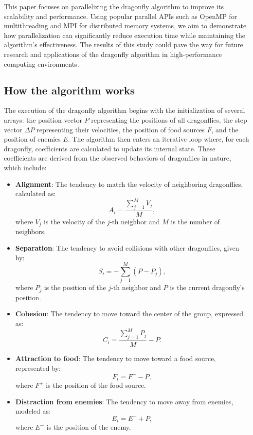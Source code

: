 \documentclass[10pt]{article}
\begin{document}
\begin{multicols}{2}
This paper focuses on parallelizing the dragonfly algorithm to improve its scalability and performance.
Using popular parallel APIs such as OpenMP for multithreading and MPI for distributed memory systems, we aim to demonstrate how parallelization can significantly reduce execution time while maintaining the algorithm's effectiveness.
The results of this study could pave the way for future research and applications of the dragonfly algorithm in high-performance computing environments.

\subsection*{How the algorithm works}
The execution of the dragonfly algorithm begins with the initialization of several arrays: the position vector $P$ representing the positions of all dragonflies, the step vector $\Delta P$ representing their velocities, the position of food sources $F$, and the position of enemies $E$. The algorithm then enters an iterative loop where, for each dragonfly, coefficients are calculated to update its internal state. These coefficients are derived from the observed behaviors of dragonflies in nature, which include:

\begin{itemize}
  \item \textbf{Alignment}: The tendency to match the velocity of neighboring dragonflies, calculated as:
  $$A_i = \frac{\sum_{j=1}^M V_j}{M},$$
  where $V_j$ is the velocity of the $j$-th neighbor and $M$ is the number of neighbors.

  \item \textbf{Separation}: The tendency to avoid collisions with other dragonflies, given by:
  $$S_i = -\sum_{j=1}^M (P - P_j),$$
  where $P_j$ is the position of the $j$-th neighbor and $P$ is the current dragonfly's position.

  \item \textbf{Cohesion}: The tendency to move toward the center of the group, expressed as:
  $$C_i = \frac{\sum_{j=1}^M P_j}{M} - P.$$

  \item \textbf{Attraction to food}: The tendency to move toward a food source, represented by:
  $$F_i = F^+ - P,$$
  where $F^+$ is the position of the food source.

  \item \textbf{Distraction from enemies}: The tendency to move away from enemies, modeled as:
  $$E_i = E^- + P,$$
  where $E^-$ is the position of the enemy.
\end{itemize}


\end{multicols}
\end{document}
